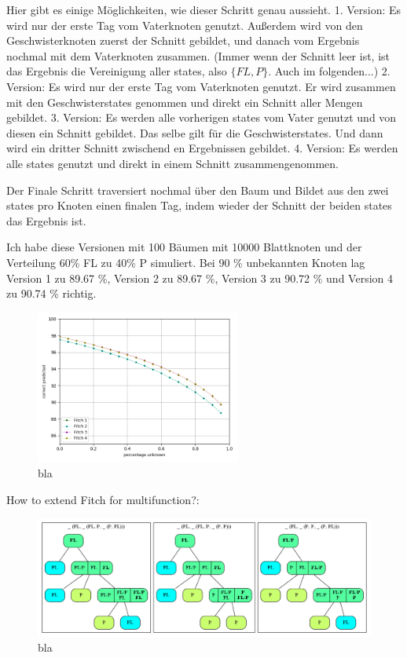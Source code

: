         Hier gibt es einige Möglichkeiten, wie dieser Schritt genau aussieht.
        1. Version: Es wird nur der erste Tag vom Vaterknoten genutzt. Außerdem wird von den 
        Geschwisterknoten zuerst der Schnitt gebildet, und danach vom Ergebnis nochmal mit dem Vaterknoten zusammen.
        (Immer wenn der Schnitt leer ist, ist das Ergebnis die Vereinigung aller states, also $\{FL,P\}$. Auch im folgenden...)
        2. Version: Es wird nur der erste Tag vom Vaterknoten genutzt. Er wird zusammen mit den 
        Geschwisterstates genommen und direkt ein Schnitt aller Mengen gebildet.
        3. Version: Es werden alle vorherigen states vom Vater genutzt und von diesen ein Schnitt gebildet.
        Das selbe gilt für die Geschwisterstates. Und dann wird ein dritter Schnitt zwischend en Ergebnissen gebildet.
        4. Version: Es werden alle states genutzt und direkt in einem Schnitt zusammengenommen.

        Der Finale Schritt traversiert nochmal über den Baum und Bildet aus den zwei states pro Knoten einen finalen
        Tag, indem wieder der Schnitt der beiden states das Ergebnis ist.

        Ich habe diese Versionen mit 100 Bäumen mit 10000 Blattknoten und der Verteilung 60\% FL zu 40\% P simuliert.
        Bei 90 \% unbekannten Knoten lag Version 1 zu 89.67 \%, Version 2 zu 89.67 \%, Version 3 zu 
          90.72 \% und Version 4 zu 90.74 \% richtig.

        \begin{figure}
          \caption{bla}
          \centering
            \includegraphics[width=0.6\textwidth]{Figures/simulation_fitch_evaluation.png}
        \end{figure}

        How to extend Fitch for multifunction?:
        \begin{figure}
          \caption{bla}
          \centering
            \includegraphics[width=1\textwidth]{Figures/Fitch2.png}
        \end{figure}

